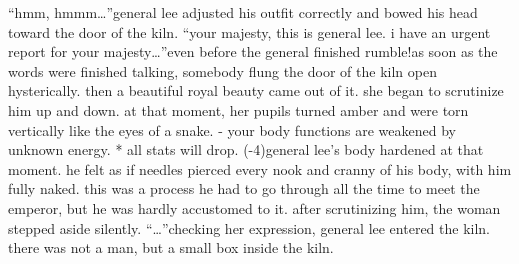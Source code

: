 “hmm, hmmm…”general lee adjusted his outfit correctly and bowed his head toward the door of the kiln.
“your majesty, this is general lee.
 i have an urgent report for your majesty…”even before the general finished rumble!as soon as the words were finished talking, somebody flung the door of the kiln open hysterically.
 then a beautiful royal beauty came out of it.
she began to scrutinize him up and down.
 at that moment, her pupils turned amber and were torn vertically like the eyes of a snake.
- your body functions are weakened by unknown energy.
* all stats will drop.
 (-4)general lee’s body hardened at that moment.
 he felt as if needles pierced every nook and cranny of his body, with him fully naked.
 this was a process he had to go through all the time to meet the emperor, but he was hardly accustomed to it.
after scrutinizing him, the woman stepped aside silently.
“…”checking her expression, general lee entered the kiln.
there was not a man, but a small box inside the kiln.

